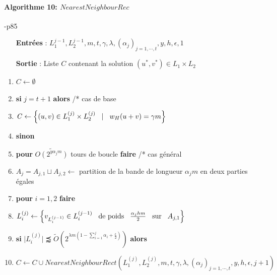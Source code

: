 \documentclass[12pt,openany]{report}
\begin{document}
\begin{center}
\begin{boxedminipage}[ poslb ]{18cm}

\paragraph{Algorithme 10: $NearestNeighbourRec  $ }\cite{Ghazal}-p85\\


\begin{itemize}
\item[\textbf{Entrées}]: $ L_1^{j-1},L_2^{j-1},m,t,\gamma,\lambda,(\alpha_j)_{j=1,\cdots,t},y,h,\epsilon,1  $
\item[\textbf{Sortie}]: Liste $\mathit{C} $ contenant la solution $(u^{*}, v^{*}) \in L_1 \times L_2  $
\end{itemize}
\begin{enumerate}
\item $\mathit{C} \gets \emptyset $
\item \textbf{si} $ j = t+1  $ \textbf{alors}
/* cas de base
\item $ \mathit{C} \gets \left\lbrace (u,v) \in L_{1}^{(j)} \times L_{2}^{(j)}\hspace{0.3cm} |\hspace{0.3cm} w_H(u+v)=\gamma m \right\rbrace   $
\item \textbf{sinon}
\item  \hspace{0.3cm}\textbf{pour} $\tilde{O(2^{y\alpha_j m})} $ tours de boucle \textbf{faire}
/* cas général
\item \hspace{0.5cm} $ A_j = A_{j,1} \sqcup A_{j,2} \gets $ partition de la bande de longueur $ \alpha_j m  $ en deux parties égales
\item \hspace{0.5cm} \textbf{pour} $i=1,2  $ \textbf{faire}
\item \hspace{0.7cm} $ L_i^{(j)}\gets \left\lbrace v_{L_i^{(j-1)}} \in L_i^{(j-1)} \hspace{0.3cm} \text{de poids} \hspace{0.3cm}\frac{\alpha_j h m}{2} \hspace{0.3cm} \text{sur} \hspace{0.3cm} A_{j,1} \right\rbrace  $

\item \hspace{0.5cm} \textbf{si} $ \mid  L_i^{(j)} \mid \precapprox \tilde{O}\left( 2^{\lambda m(1-\sum_{i=1}^{j}\alpha_i + \frac{\epsilon}{2})} \right)  $ \textbf{alors}
\item \hspace{1cm} $ \mathit{C} \gets \mathit{C}\cup NearestNeighbourRect(L_1^{(j)},L_2^{(j)},m,t,\gamma,\lambda,(\alpha_j)_{j=1,\cdots,t},y,h,\epsilon,j+1)  $



\end{enumerate}

\end{boxedminipage}
\end{center}
\end{document}
